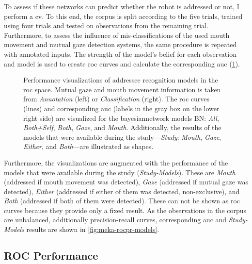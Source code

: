 To assess if these networks can predict whether the \gls{robot} is addressed or not, I perform a \gls{cv}.
To this end, the corpus is split according to the five trials, trained using four trials and tested on observations from the remaining trial.
Furthermore, to assess the influence of mis-classifications of the used mouth movement and mutual gaze detection systems, the same procedure is repeated with annotated inputs.
The strength of the model's belief for each observation and model is used to create \gls{roc} curves and calculate the corresponding \gls{auc} (\cref{fig:meka-roc-models}).
\begin{figure}[htb]
    \centering
    
    \vspace{-25pt}
    \caption[ROC performance of addressee models.]{\label{fig:meka-roc-models}
    Performance visualizations of \gls{addressee} recognition models in the \gls{roc} space.
    Mutual gaze and mouth movement information is taken from \emph{Annotation} (left) or \emph{Classification} (right).
    The \gls{roc} curves (lines) and corresponding \gls{auc} (labels in the gray box on the lower right side) are visualized for the \Gls{bayesiannetwork} models BN: \emph{All}, \emph{Both+Self}, \emph{Both}, \emph{Gaze}, and \emph{Mouth}.
    Additionally, the results of the models that were available during the study---\emph{Study}: \emph{Mouth}, \emph{Gaze}, \emph{Either}, and \emph{Both}---are illustrated as shapes.
    }
\end{figure}
Furthermore, the visualizations are augmented with the performance of the models that were available during the study (\emph{Study-Models}).
These are \emph{Mouth} (addressed if mouth movement was detected), \emph{Gaze} (addressed if mutual gaze was detected), \emph{Either} (addressed if either of them was detected, non-exclusive), and \emph{Both} (addressed if both of them were detected).
These can not be shown as \gls{roc} curves because they provide only a fixed result.
As the observations in the corpus are unbalanced, additionally \gls{precision}-\gls{recall} curves, corresponding \gls{auc} and \emph{Study-Models} results are shown in \cref{fig:meka-rocpr-models}.

\subsection{ROC Performance}

